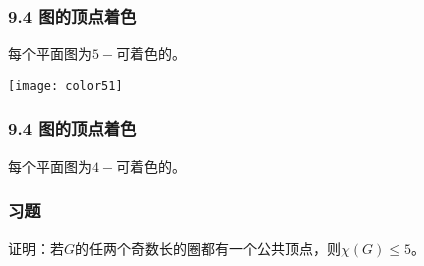 \documentclass{beamer}
\begin{document}
\begin{CJK}{UTF8}{gbsn}
\begin{frame}
  \frametitle{9.4 图的顶点着色}
  \begin{Thm3}
    每个平面图为$5-$可着色的。
  \end{Thm3}
\vspace{1cm}
\texttt{[image: color51]}
\end{frame}

\begin{frame}
  \frametitle{9.4 图的顶点着色}
  \begin{Thm}
    每个平面图为$4-$可着色的。
  \end{Thm}
\end{frame}
\begin{frame}
  \frametitle{习题}
  \begin{Exercise}
    证明：若$G$的任两个奇数长的圈都有一个公共顶点，则$\chi(G)\leq 5$。
  \end{Exercise}
\end{frame}
\end{CJK}
\end{document}
